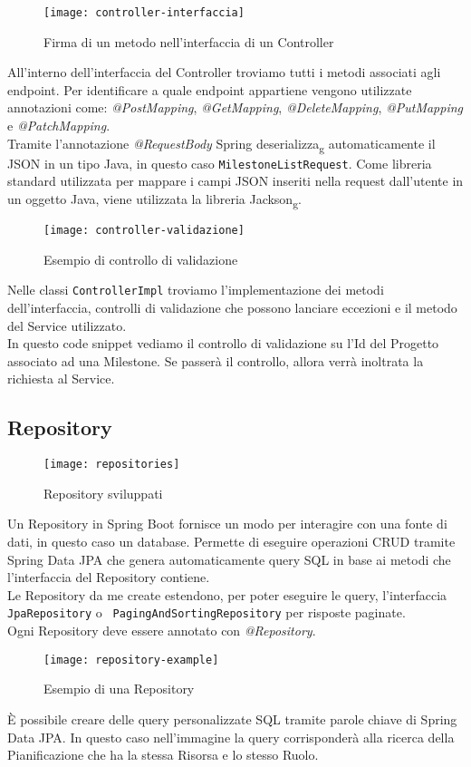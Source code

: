 


\begin{figure}[H] 
    \centering 
    \texttt{[image: controller-interfaccia]} 
    \caption{Firma di un metodo nell'interfaccia di un Controller}
\end{figure}
\noindent All'interno dell'interfaccia del Controller troviamo tutti i metodi associati agli endpoint. Per identificare a quale endpoint appartiene vengono utilizzate annotazioni come: \textit{@PostMapping}, \textit{@GetMapping}, \textit{@DeleteMapping}, \textit{@PutMapping} e \textit{@PatchMapping}.\\
Tramite l'annotazione \textit{@RequestBody} Spring deserializza\textsubscript{g} automaticamente il JSON in un tipo Java, in questo caso \texttt{MilestoneListRequest}.
Come libreria standard utilizzata per mappare i campi JSON inseriti nella request dall'utente in un oggetto Java, viene utilizzata la libreria Jackson\textsubscript{g}.

\begin{figure}[H] 
    \centering 
    \texttt{[image: controller-validazione]} 
    \caption{Esempio di controllo di validazione}
\end{figure}
\noindent Nelle classi \texttt{ControllerImpl} troviamo l'implementazione dei metodi dell'interfaccia, controlli di validazione che possono lanciare eccezioni e il metodo del Service utilizzato.\\
In questo code snippet vediamo il controllo di validazione su l'Id del Progetto associato ad una Milestone. Se passerà il controllo, allora verrà inoltrata la richiesta al Service.

\subsection{Repository}
\begin{figure}[H] 
    \centering 
    \texttt{[image: repositories]} 
    \caption{Repository sviluppati}
\end{figure}
Un Repository in Spring Boot fornisce un modo per interagire con una fonte di dati, in questo caso un database. Permette di eseguire operazioni CRUD tramite Spring Data JPA che genera automaticamente query SQL in base ai metodi che l'interfaccia del Repository contiene.\\
Le Repository da me create estendono, per poter eseguire le query, l'interfaccia \texttt{JpaRepository} o \texttt{ PagingAndSortingRepository} per risposte paginate.\\
Ogni Repository deve essere annotato con \textit{@Repository}. 
\begin{figure}[H] 
    \centering 
    \texttt{[image: repository-example]} 
    \caption{Esempio di una Repository}
\end{figure}
\noindent È possibile creare delle query personalizzate SQL tramite parole chiave di Spring Data JPA. In questo caso nell'immagine la query corrisponderà alla ricerca della Pianificazione che ha la stessa Risorsa e lo stesso Ruolo.

